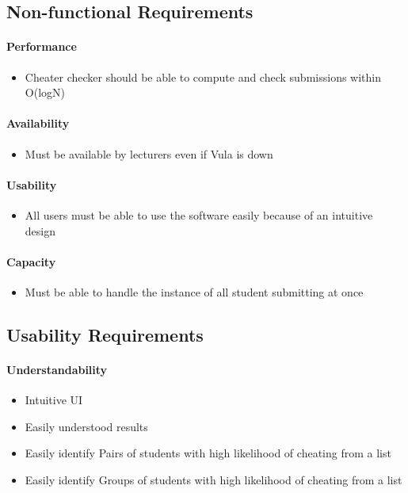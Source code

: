 \documentclass[11pt,a4paper]{article}
\begin{document}
\subsection{Non-functional Requirements}

\paragraph{Performance}
\begin{itemize}
    \item Cheater checker should be able to compute and check submissions within O(logN) 
\end{itemize}

\paragraph{Availability}
\begin{itemize}
    \item Must be available by lecturers even if Vula is down
\end{itemize}

\paragraph{Usability}
\begin{itemize}
    \item All users must be able to use the software easily because of an intuitive design
\end{itemize}

\paragraph{Capacity}
\begin{itemize}
    \item Must be able to handle the instance of all student submitting at once
\end{itemize}

\subsection{Usability Requirements}

\paragraph{Understandability}
\begin{itemize}
    \item Intuitive UI
    \item Easily understood results
    \item Easily identify Pairs of students with high likelihood of cheating from a list
    \item Easily identify Groups of students with high likelihood of cheating from a list
\end{itemize}
\end{document}
